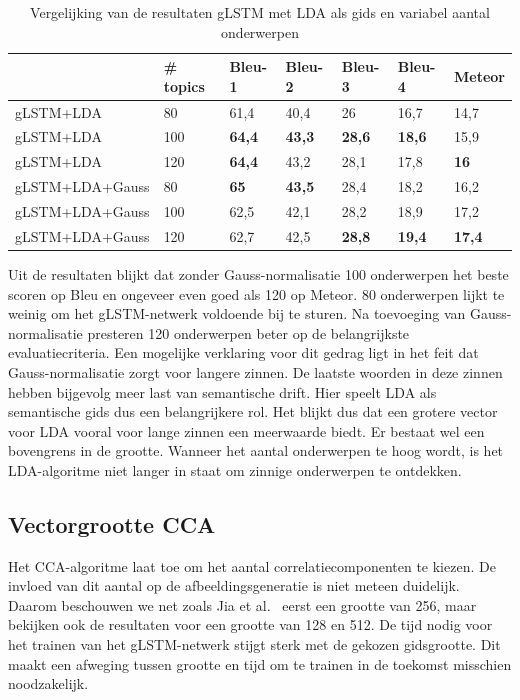     \begin{table}
    	\centering
    	\begin{tabular}{lllllll}
    		~                 &\# topics  & Bleu-1 & Bleu-2 & Bleu-3 & Bleu-4 & Meteor \\ \hline
    		gLSTM+LDA       & 80  & 61,4   & 40,4  & 26   & 16,7   & 14,7     \\ 
    		gLSTM+LDA      & 100  & \textbf{64,4}   & \textbf{43,3}   & \textbf{28,6}   & \textbf{18,6}   & 15,9  \\
    		gLSTM+LDA      &120   & \textbf{64,4}   & 43,2   & 28,1   & 17,8   & \textbf{16}  \\\hline
    		gLSTM+LDA+Gauss &80 & \textbf{65}   & \textbf{43,5}   & 28,4   & 18,2   & 16,2  \\ 
    		gLSTM+LDA+Gauss& 100&62,5& 42,1   & 28,2   & 18,9   & 17,2    \\
    	gLSTM+LDA+Gauss&120 & 62,7   & 42,5   &\textbf{28,8}   & \textbf{19,4}   & \textbf{17,4}  \\\hline
    	\end{tabular}
    	\caption{Vergelijking van de resultaten gLSTM met LDA als gids en variabel aantal onderwerpen}	
    	\label{table:lda-onderwerpen}
    \end{table}
    
Uit de resultaten blijkt dat zonder Gauss-normalisatie 100 onderwerpen het beste scoren op Bleu en ongeveer even goed als 120 op Meteor. 80 onderwerpen lijkt te weinig om het gLSTM-netwerk voldoende bij te sturen. Na toevoeging van Gauss-normalisatie presteren 120 onderwerpen beter op de belangrijkste evaluatiecriteria. Een mogelijke verklaring voor dit gedrag ligt in het feit dat Gauss-normalisatie zorgt voor langere zinnen. De laatste woorden in deze zinnen hebben bijgevolg meer last van semantische drift. Hier speelt LDA als semantische gids dus een belangrijkere rol. Het blijkt dus dat een grotere vector voor LDA vooral voor lange zinnen een meerwaarde biedt. Er bestaat wel een bovengrens in de grootte. Wanneer het aantal onderwerpen te hoog wordt, is het LDA-algoritme niet langer in staat om zinnige onderwerpen te ontdekken.

\subsection{Vectorgrootte CCA} 
Het CCA-algoritme laat toe om het aantal correlatiecomponenten te kiezen. De invloed van dit aantal op de afbeeldingsgeneratie is niet meteen duidelijk. Daarom beschouwen we net zoals Jia et al.~\cite{Fernando2015} eerst een grootte van 256, maar bekijken ook de resultaten voor een grootte van 128 en 512. De tijd nodig voor het trainen van het gLSTM-netwerk stijgt sterk met de gekozen gidsgrootte. Dit maakt een afweging tussen grootte en tijd om te trainen in de toekomst misschien noodzakelijk.

